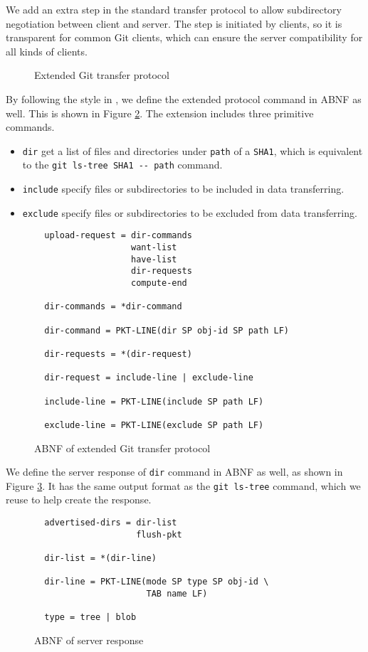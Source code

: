 \documentclass[copyrightwanted=false]{sigplanconf}
\begin{document}
We add an extra step in the standard transfer protocol to allow subdirectory
negotiation between client and server.
The step is initiated by clients, so it is transparent for common Git clients,
which can ensure the server compatibility for all kinds of clients.
\begin{figure}[htpb]
  \centering
  
  \caption{Extended Git transfer protocol}
  \label{fig:git-proto-ext-seq}
\end{figure}

By following the style in \cite{tran-protocol}, we define the extended
protocol command in ABNF as well. This is shown in Figure
\ref{fig:git-proto-ext-ABNF}.
The extension includes three primitive commands.
\begin{itemize}
  \item \verb|dir| get a list of files and directories under \verb|path| of a
    \verb|SHA1|, which is equivalent to the 
    \verb|git ls-tree SHA1 -- path| command.

  \item \verb|include| specify files or subdirectories to be included in data
    transferring.

  \item \verb|exclude| specify files or subdirectories to be excluded from data
    transferring.
\end{itemize}

\begin{figure}[htpb]
  \centering
  \begin{verbatim}
  upload-request = dir-commands
                   want-list
                   have-list
                   dir-requests
                   compute-end

  dir-commands = *dir-command

  dir-command = PKT-LINE(dir SP obj-id SP path LF)

  dir-requests = *(dir-request)

  dir-request = include-line | exclude-line

  include-line = PKT-LINE(include SP path LF)

  exclude-line = PKT-LINE(exclude SP path LF)
  \end{verbatim}
  \caption{ABNF of extended Git transfer protocol}
  \label{fig:git-proto-ext-ABNF}
\end{figure}

We define the server response of \verb|dir| command in ABNF as well, as shown
in Figure \ref{fig:server-response-ABNF}.
It has the same output format as the \verb|git ls-tree| command, which we reuse to
help create the response.
\begin{figure}[htpb]
  \centering
  \begin{verbatim}
  advertised-dirs = dir-list
                    flush-pkt

  dir-list = *(dir-line)

  dir-line = PKT-LINE(mode SP type SP obj-id \
                      TAB name LF)

  type = tree | blob
  \end{verbatim}
  \caption{ABNF of server response}
  \label{fig:server-response-ABNF}
\end{figure}
\end{document}

